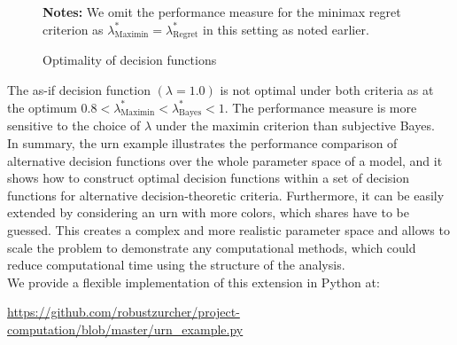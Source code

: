 \begin{figure}[h!]\centering
{}\vspace{-0.9cm}
\begin{center}
\begin{minipage}[t]{0.5\columnwidth}
\item \scriptsize{\textbf{Notes:} We omit the performance measure for the minimax regret criterion as $\lambda^*_{\text{Maximin}} = \lambda^*_{\text{Regret}}$ in this setting as noted earlier.}
\end{minipage}
\end{center}
\caption{Optimality of decision functions}\label{Optimality of decision functions for urn}
\end{figure}\FloatBarrier

The as-if decision function $(\lambda=1.0)$ is not optimal under both criteria as at the optimum  $0.8 < \lambda^*_{\text{Maximin}} < \lambda^*_{\text{Bayes}} < 1$. The performance measure is more sensitive to the choice of $\lambda$ under the maximin criterion than subjective Bayes.\\

In summary, the urn example illustrates the performance comparison of alternative decision functions over the whole parameter space of a model, and it shows how to construct optimal decision functions within a set of decision functions for alternative decision-theoretic criteria. Furthermore, it can be easily extended by considering an urn with more colors, which shares have to be guessed. This creates a complex and more realistic parameter space and allows to scale the problem to demonstrate any computational methods, which could reduce computational time using the structure of the analysis.\\

We provide a flexible implementation of this extension in Python at:

\begin{center}
\href{https://github.com/robustzurcher/project-computation/blob/master/implementation.py}{https://github.com/robustzurcher/project-computation/blob/master/urn\_example.py}
\end{center}
